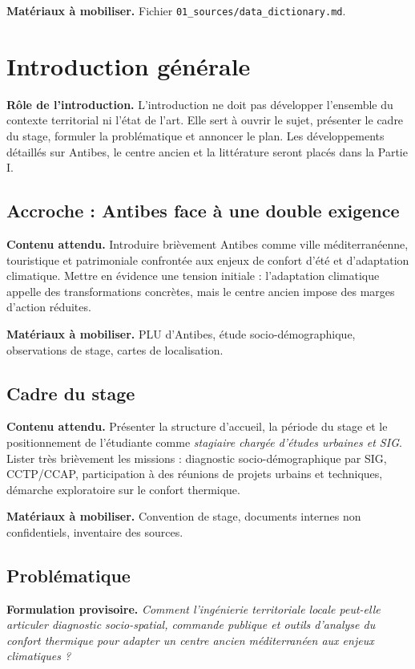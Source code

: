 \documentclass[11pt,a4paper]{article}
\begin{document}
\textbf{Matériaux à mobiliser.} Fichier \texttt{01\_sources/data\_dictionary.md}.

\section{Introduction générale}

\textbf{Rôle de l'introduction.} L'introduction ne doit pas développer l'ensemble du contexte territorial ni l'état de l'art. Elle sert à ouvrir le sujet, présenter le cadre du stage, formuler la problématique et annoncer le plan. Les développements détaillés sur Antibes, le centre ancien et la littérature seront placés dans la Partie I.

\subsection{Accroche : Antibes face à une double exigence}
\textbf{Contenu attendu.} Introduire brièvement Antibes comme ville méditerranéenne, touristique et patrimoniale confrontée aux enjeux de confort d'été et d'adaptation climatique. Mettre en évidence une tension initiale : l'adaptation climatique appelle des transformations concrètes, mais le centre ancien impose des marges d'action réduites.

\textbf{Matériaux à mobiliser.} PLU d'Antibes, étude socio-démographique, observations de stage, cartes de localisation.

\subsection{Cadre du stage}
\textbf{Contenu attendu.} Présenter la structure d'accueil, la période du stage et le positionnement de l'étudiante comme \emph{stagiaire chargée d'études urbaines et SIG}. Lister très brièvement les missions : diagnostic socio-démographique par SIG, CCTP/CCAP, participation à des réunions de projets urbains et techniques, démarche exploratoire sur le confort thermique.

\textbf{Matériaux à mobiliser.} Convention de stage, documents internes non confidentiels, inventaire des sources.

\subsection{Problématique}
\textbf{Formulation provisoire.} \emph{Comment l'ingénierie territoriale locale peut-elle articuler diagnostic socio-spatial, commande publique et outils d'analyse du confort thermique pour adapter un centre ancien méditerranéen aux enjeux climatiques ?}
\end{document}
